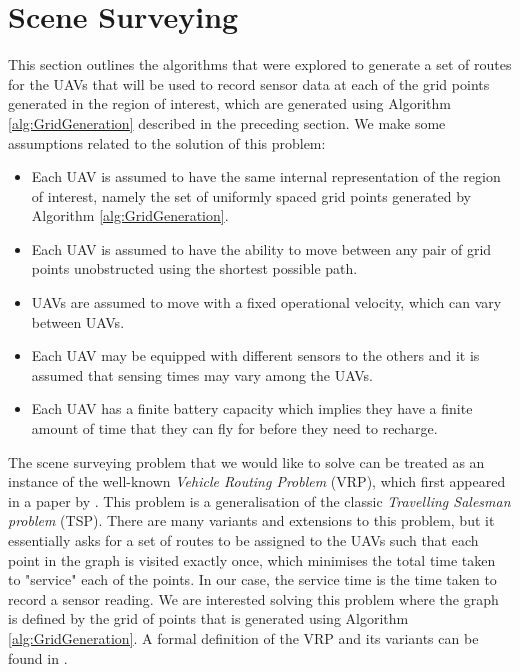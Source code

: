 
\section{Scene Surveying}
This section outlines the algorithms that were explored to generate a set of routes for the UAVs that will be used to record sensor data at each of the grid points generated in the region of interest, which are generated using Algorithm \ref{alg:GridGeneration} described in the preceding section. We make some assumptions related to the solution of this problem:
\begin{itemize}
    \item Each UAV is assumed to have the same internal representation of the region of interest, namely the set of uniformly spaced grid points generated by Algorithm \ref{alg:GridGeneration}.
    \item Each UAV is assumed to have the ability to move between any pair of grid points unobstructed using the shortest possible path.
    \item UAVs are assumed to move with a fixed operational velocity, which can vary between UAVs.
    \item Each UAV may be equipped with different sensors to the others and it is assumed that sensing times may vary among the UAVs.
    \item Each UAV has a finite battery capacity which implies they have a finite amount of time that they can fly for before they need to recharge.
\end{itemize}


The scene surveying problem that we would like to solve can be treated as an instance of the well-known \textit{Vehicle Routing Problem} (VRP), which first appeared in a paper by \citeauthor{Dantzig1959TheProblem} \cite{Dantzig1959TheProblem}. This problem is a generalisation of the classic \textit{Travelling Salesman problem} (TSP). There are many variants and extensions to this problem, but it essentially asks for a set of routes to be assigned to the UAVs such that each point in the graph is visited exactly once, which minimises the total time taken to "service" each of the points. In our case, the service time is the time taken to record a sensor reading. We are interested solving this problem where the graph is defined by the grid of points that is generated using Algorithm \ref{alg:GridGeneration}. A formal definition of the VRP and its variants can be found in \cite{Toth2002TheProblem}.

